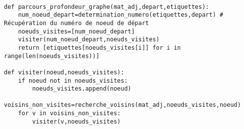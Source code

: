 \ifprof
\begin{corrige}~\\
\begin{lstlisting}
def parcours_profondeur_graphe(mat_adj,depart,etiquettes):
    num_noeud_depart=determination_numero(etiquettes,depart) # Récupération du numéro de noeud de départ
    noeuds_visites=[num_noeud_depart]
    visiter(num_noeud_depart,noeuds_visites)
    return [etiquettes[noeuds_visites[i]] for i in range(len(noeuds_visites))]
    
def visiter(noeud,noeuds_visites):
    if noeud not in noeuds_visites:
        noeuds_visites.append(noeud)
    voisins_non_visites=recherche_voisins(mat_adj,noeuds_visites,noeud)
    for v in voisins_non_visites:
        visiter(v,noeuds_visites)

\end{lstlisting}
\end{corrige}
\else
\fi
      
